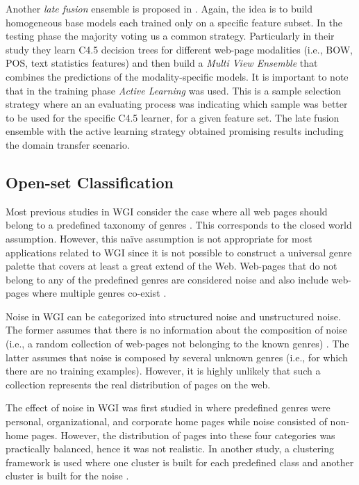 Another \textit{late fusion} ensemble is proposed in \parencite{finn2006learning}. Again, the idea is to build homogeneous base models each trained only on a specific feature subset. In the testing phase the majority voting us a common strategy. Particularly in their study they learn C4.5 decision trees for different web-page modalities (i.e., BOW, POS, text statistics features) and then build a \textit{Multi View Ensemble} that combines the predictions of the modality-specific models. It is important to note that in the training phase \textit{Active Learning} was used. This is a sample selection strategy where an an evaluating process was indicating which sample was better to be used for the specific C4.5 learner, for a given feature set. The late fusion ensemble with the active learning strategy obtained promising results including the domain transfer scenario.

\subsection{Open-set Classification}
\label{chap:relevant_work:sec:openset_and_noise}

Most previous studies in WGI consider the case where all web pages should belong to a predefined taxonomy of genres \parencite{Lim2005,santini2007automatic,kanaris2009learning,jebari2014pureURL}. This corresponds to the closed world assumption. However, this naïve assumption is not appropriate for most applications related to WGI since it is not possible to construct a universal genre palette that covers at least a great extend of the Web. Web-pages that do not belong to any of the predefined genres are considered noise and also include web-pages where multiple genres co-exist \parencite{santini2011cross,levering2008using}. 

Noise in WGI can be categorized into structured noise and  unstructured noise. The former assumes that there is no information about the composition of noise (i.e., a random collection of web-pages not belonging to the known genres) \parencite{santini2011cross}. The latter assumes that noise is composed by several unknown genres (i.e., for which there are no training examples). However, it is highly unlikely that such a collection  represents the real distribution of pages on the web.

The effect of noise in WGI  was first studied in \parencite{shepherd2004cybergenre,kennedy2005automatic} where predefined genres were personal, organizational, and corporate home pages while noise consisted of non-home pages. However, the distribution of pages into these four categories was practically balanced, hence it was not realistic. In another study, a clustering framework is used where one cluster is built for each predefined class and another cluster is built for the noise \parencite{kennedy2005automatic}. 

